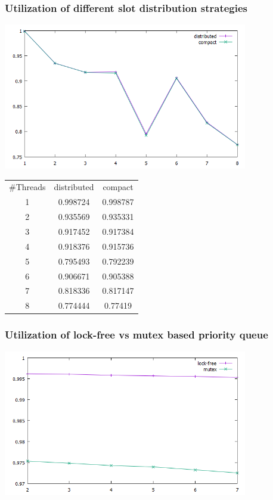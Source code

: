 \documentclass{beamer}
\begin{document}
\begin{frame}
	\frametitle{Utilization of different slot distribution strategies}
	\begin{center}
		\includegraphics[width=0.8\textwidth]{img/slot_distr.png}
	\end{center}
	\begin{tabular}{c|c|c}
		\#Threads & distributed & compact \\
		1 & 0.998724 & 0.998787 \\
		2 & 0.935569 & 0.935331 \\
		3 & 0.917452 & 0.917384 \\
		4 & 0.918376 & 0.915736 \\
		5 & 0.795493 & 0.792239 \\
		6 & 0.906671 & 0.905388 \\
		7 & 0.818336 & 0.817147 \\
		8 & 0.774444 & 0.77419		
	\end{tabular}
\end{frame}

\begin{frame}
	\frametitle{Utilization of lock-free vs mutex based priority queue}
	\begin{center}
		\includegraphics[width=0.8\textwidth]{img/lock_free.png}
	\end{center}
\end{frame}
\end{document}
